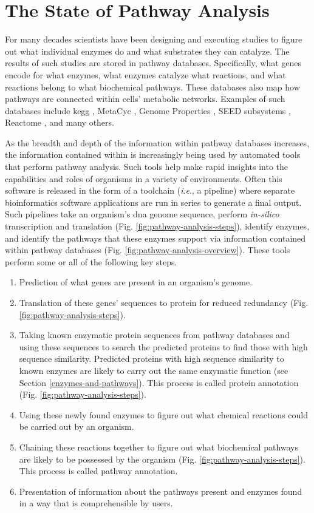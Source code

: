 \section{The State of Pathway Analysis} \label{pathway-databases}

For many decades scientists have been designing and executing studies to figure 
out what individual enzymes do and what substrates they can catalyze. The 
results of such studies are stored in pathway databases. Specifically, what 
genes encode for what enzymes, what enzymes catalyze what reactions, and what 
reactions belong to what biochemical pathways. These databases also map how 
pathways are connected within cells' metabolic networks. Examples of such 
databases include \gls{kegg} \cite{kanehisa2000kegg}, MetaCyc 
\cite{karp2002metacyc}, Genome Properties \cite{richardson2018genome}, SEED 
subsystems \cite{overbeek2005subsystems}, Reactome \cite{croft2013reactome}, and 
many others.

As the breadth and depth of the information within pathway databases increases, 
the information contained within is increasingly being used by automated tools 
that perform pathway analysis. Such tools help make rapid insights into the 
capabilities and roles of organisms in a variety of environments. Often this 
software is released in the form of a toolchain (\textit{i}.\textit{e}., a 
pipeline) where separate bioinformatics software applications are run in series 
to generate a final output. Such pipelines take an organism's \gls{dna} genome 
sequence, perform \textit{in-silico} transcription and translation (Fig. 
\ref{fig:pathway-analysis-steps}), identify enzymes, and identify the pathways 
that these enzymes support via information contained within pathway databases (Fig. 
\ref{fig:pathway-analysis-overview}). These tools perform some or all of the 
following key steps.

\begin{enumerate}
\item Prediction of what genes are present in an organism's genome.
\item Translation of these genes' sequences to protein for reduced redundancy 
(Fig. \ref{fig:pathway-analysis-steps}).
\item Taking known enzymatic protein sequences from pathway databases and using 
these sequences to search the predicted proteins to find those with high 
sequence similarity. Predicted proteins with high sequence similarity to known 
enzymes are likely to carry out the same enzymatic function (see Section 
\ref{enzymes-and-pathways}). This process is called protein annotation (Fig. 
\ref{fig:pathway-analysis-steps}).
\item Using these newly found enzymes to figure out what chemical reactions 
could be carried out by an organism.
\item Chaining these reactions together to figure out what biochemical pathways 
are likely to be possessed by the organism (Fig. 
\ref{fig:pathway-analysis-steps}). This process is called pathway annotation.
\item Presentation of information about the pathways present and enzymes found 
in a way that is comprehensible by users.
\end{enumerate}

